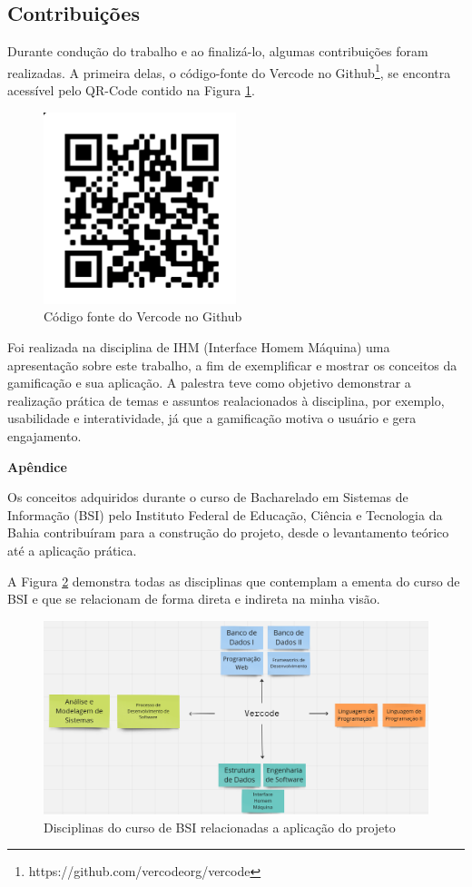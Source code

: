 \documentclass[12pt]{article}
\begin{document}
\subsection{Contribuições} \label{sec:contribuicoes}

Durante condução do trabalho e ao finalizá-lo, algumas contribuições foram realizadas. A primeira delas, o código-fonte do Vercode no Github\footnote{https://github.com/vercodeorg/vercode}, se encontra acessível pelo QR-Code contido na Figura \ref{fig:qrcode_codigo}.
    
\begin{figure}[ht!]
\centering
\includegraphics[width=0.5\textwidth]{imagens/qrcode_codigo.png}
\caption{Código fonte do Vercode no Github}
\label{fig:qrcode_codigo}
\end{figure}

Foi realizada na disciplina de IHM (Interface Homem Máquina) uma apresentação sobre este trabalho, a fim de exemplificar e mostrar os conceitos da gamificação e sua aplicação. A palestra teve como objetivo demonstrar a realização prática de temas e assuntos realacionados à disciplina, por exemplo, usabilidade e interatividade, já que a gamificação motiva o usuário e gera engajamento.

\newpage




\newpage

\noindent\textbf{Apêndice}

Os conceitos adquiridos durante o curso de Bacharelado em Sistemas de Informação (BSI) pelo Instituto Federal de Educação, Ciência e Tecnologia da Bahia contribuíram para a construção do projeto, desde o levantamento teórico até a aplicação prática. 

A Figura \ref{fig:disciplinas} demonstra todas as disciplinas que contemplam a ementa do curso de BSI e que se relacionam de forma direta e indireta na minha visão.

\begin{figure}[ht!]
\centering
\includegraphics[width=1.0\textwidth]{imagens/disciplinas.png}
\caption{Disciplinas do curso de BSI relacionadas a aplicação do projeto}
\label{fig:disciplinas}
\end{figure}
\end{document}
